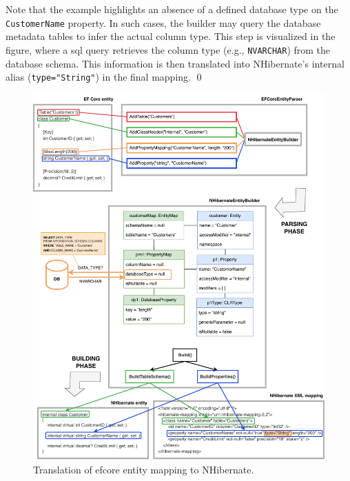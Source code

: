 \begin{example}
Note that the example highlights an absence of a defined database type on the \texttt{CustomerName} property. In such cases, the builder may query the database metadata tables to infer the actual column type. This step is visualized in the figure, where a \acrshort{sql} query retrieves the column type (e.g., \texttt{NVARCHAR}) from the database schema. This information is then translated into NHibernate's internal alias (\texttt{type="String"}) in the final mapping.
\qed
\end{example}


\begin{figure}[!htp]
  \centering
  \includegraphics[width=\textwidth]{thesis/img/thesis/04_parsing_building.drawio.pdf}
  \caption{Translation of \acrshort{efcore} entity mapping to NHibernate.}
  \label{fig:translation_complete}
\end{figure}

